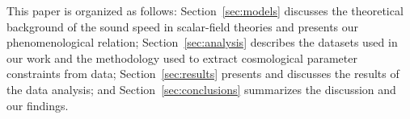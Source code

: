 \documentclass[%
reprint,
superscriptaddress,
preprint numbers,
nofootinbib,
amsmath,amssymb,
aps,
prd
]{revtex4-2}
\begin{document}
This paper is organized as follows: Section~\ref{sec:models} discusses the theoretical background of the sound speed in scalar-field theories and presents our phenomenological relation; Section~\ref{sec:analysis} describes the datasets used in our work and the methodology used to extract cosmological parameter constraints from data; Section~\ref{sec:results} presents and discusses the results of the data analysis; and Section~\ref{sec:conclusions} summarizes the discussion and our findings.


\end{document}
